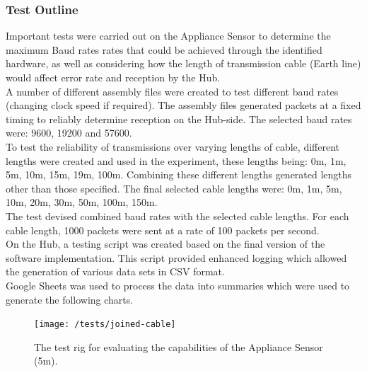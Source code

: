 \documentclass[preprint,12pt,3p]{elsarticle}
\begin{document}
\subsubsection{Test Outline}
Important tests were carried out on the Appliance Sensor to determine the maximum Baud rates rates that could be achieved through the identified hardware, as well as considering how the length of transmission cable (Earth line) would affect error rate and reception by the Hub.\\
A number of different assembly files were created to test different baud rates (changing clock speed if required). The assembly files generated packets at a fixed timing to reliably determine reception on the Hub-side. The selected baud rates were: 9600, 19200 and 57600.\\
To test the reliability of transmissions over varying lengths of cable, different lengths were created and used in the experiment, these lengths being: 0m, 1m, 5m, 10m, 15m, 19m, 100m. Combining these different lengths generated lengths other than those specified. The final selected cable lengths were: 0m, 1m, 5m, 10m, 20m, 30m, 50m, 100m, 150m.\\
The test devised combined baud rates with the selected cable lengths. For each cable length, 1000 packets were sent at a rate of 100 packets per second.\\
On the Hub, a testing script was created based on the final version of the software implementation. This script provided enhanced logging which allowed the generation of various data sets in CSV format.\\
Google Sheets was used to process the data into summaries which were used to generate the following charts.

\begin{figure}[H]
\centering
\texttt{[image: /tests/joined-cable]}
\caption{The test rig for evaluating the capabilities of the Appliance Sensor (5m).}
\label{fig:joined-cable}
\end{figure}
\end{document}
